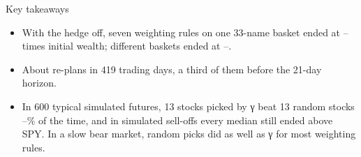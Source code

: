 {\renewcommand{\vnfootleft}{A paper-trading version of this system is running now; its results are not part of this
  talk.}
\begin{frame}{Key takeaways}
  \begin{itemize}
    \setlength{\itemsep}{1.1em}
    \item {\fontsize{10.5}{12.6}\selectfont{}} {\fontsize{10}{12.6}\selectfont With the hedge off, seven weighting rules on one 33-name basket ended at
      \SectorLo–\SectorHi{} times initial wealth; different baskets ended at \BasketLo–\BasketHi.\par}
    \item {\fontsize{10.5}{12.6}\selectfont{}} {\fontsize{10}{12.6}\selectfont About \Rebalances{} re-plans in 419 trading days, a third of
      them before the 21-day horizon.\par}
    \item {\fontsize{10.5}{12.6}\selectfont{}}
      {\fontsize{10}{12.6}\selectfont In 600 typical simulated futures, 13 stocks picked by γ beat 13 random stocks
      \TypicalLo–\TypicalHi\% of the time, and in simulated sell-offs every median still ended above SPY. In a slow
      bear market, random picks did as well as γ for most weighting rules.\par}
  \end{itemize}
\end{frame}}
